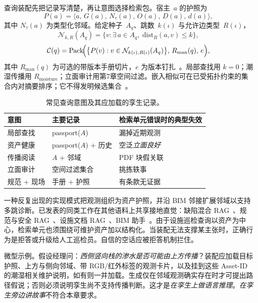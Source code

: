 查询装配先把记录写清楚，再让意图选择检索包。宿主~$a$ 的护照为
\begin{equation}
\label{eq:ch8-passport}
P(a)=\bigl\langle a,\,G(a),\,N_{\tau}(a),\,O(a),\,D(a),\,d(a)\bigr\rangle,
\end{equation}
其中 $N_{\tau}(a)$ 为类型化邻域。给定种子~$A_q$、跳数~$k(\iota)$ 与允许边类型~$R(\iota)$，
\begin{equation}
\label{eq:ch8-khop}
\mathcal{N}_{k,R}(A_q)=\bigl\{v:\exists\,a\in A_q,\;\mathrm{dist}_{R}(a,v)\le k\bigr\},
\end{equation}
\begin{equation}
\label{eq:ch8-package}
\mathcal{C}(q)=\mathrm{Pack}\!\Bigl(\bigl\{P(v):v\in\mathcal{N}_{k(\iota),R(\iota)}(A_q)\bigr\},\,R_{\mathrm{man}}(q),\,e\Bigr),
\end{equation}
其中 $R_{\mathrm{man}}(q)$ 为可选的带版本手册切片，$e$ 为版本钉扎~\cite{lewis2020,peng2024,joffe2025buildingcodes}。局部查找用 $k=0$；潮湿传播用 $R_{\mathrm{moisture}}$；立面审计用第7章空间过滤。嵌入相似可在已受拓扑约束的集合内对摘要排序；它不得发明候选集合~\cite{peng2024,jeon2025hybridrag}。

\begin{table}[htbp]
\centering
\caption{常见查询意图及其应加载的孪生记录。}
\label{tab:ch8-intents}
\begin{tabular}{llp{4.8cm}}
\toprule
意图 & 主要记录 & 检索单元错误时的典型失效 \\
\midrule
局部查找 & passport($A$) & 漏掉近期观测 \\
资产健康 & passport($A$) + 历史 & 空泛\emph{立面良好} \\
传播阅读 & $A$ + 邻域 & PDF 块假关联 \\
立面审计 & 空间过滤集合 & 挑拣轶事 \\
规范 + 现场 & 手册 + 护照 & 有条款无证据 \\
\bottomrule
\end{tabular}
\end{table}

一种反复出现的实现模式把观测组织为资产护照，并沿 BIM 邻接扩展邻域以支持多跳诊断。已发表的同类工作在其他语料上共享接地直觉：缺陷混合 RAG~\cite{jeon2025hybridrag}、规范与安全 RAG~\cite{joffe2025buildingcodes,lee2024ragsafety}、设施文档 RAG~\cite{krutli2025fmrags}、BIM 助手~\cite{zheng2023bimassistant}。由于设施巡检查询以资产为中心，检索单元也须围绕可维护资产加以结构化。当装配无法支撑某主张时，正确行为是拒答或升级给人工巡检员。自信的空话应被拒答机制拦住。

微型示例。假设经理问：\emph{西侧竖向栈的渗水是否可能由上方传播}？装配应加载目标护照、上方与侧向邻域、带 RGB/红外标签的观测卡片，以及挂到这些 Asset-ID 的潮湿相关维护说明，如有则一并加载。生成仅在邻域观测确实存在时才可提出路径假说；否则必须说明孪生尚不支持传播判断。这才是\emph{在孪生上做语言推理}。\emph{在孪生旁边讲故事}不符合本章要求。


